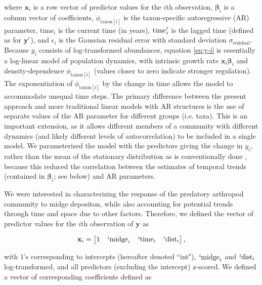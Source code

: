 \noindent where $\mathbf{x}_i$ is a row vector of predictor values for the $i$th
observation,
${\boldsymbol\beta}_i$ is a column vector of coefficients,
$\phi_{\text{taxon}[i]}$ is the taxon-specific autoregressive (AR) parameter,
$\text{time}_i$ is the current time (in years),
$\text{time}\sp{\prime}_i$ is the lagged time (defined as for  $\mathbf{y\sp{\prime}}$),
and $\epsilon_i$  is the Gaussian residual
error with standard deviation $\sigma_{\text{residual}}$.
Because $y_i$ consists of log-transformed abundances, equation \ref{eq:y-i} is
essentially a log-linear model of population dynamics, with intrinsic growth rate
$\mathbf{x}_i{\boldsymbol\beta}_i$ and density-dependence $\phi_{\text{taxon}[i]}$
(values closer to zero indicate stronger regulation).
The exponentiation of $\phi_{\text{taxon}[i]}$ by the change in time allows the model
to accommodate unequal time steps.
The primary difference between the present approach and more traditional linear models
with AR structures \citep[e.g ][]{Zuur2009} is the use of separate values of the AR
parameter for different groups (i.e. taxa).
This is an important extension, as it allows different members of a community with
different dynamics (and likely different levels of autocorrelation) to be included
in a single model.
We parameterized the model with the predictors giving the change in $y_i$,
rather than the mean of the stationary distribution as is conventionally done
\citep{Harvey1990, Ives2006},
because this reduced the correlation between the estimates of temporal trends
(contained in ${\boldsymbol\beta}_i$; see below) and AR parameters.

We were interested in characterizing the response of the predatory arthropod
community to midge depositon, while also accounting for potential trends through
time and space due to other factors.
Therefore, we defined the vector of predictor values for the $i$th observation
of $\mathbf{y}$ as

\begin{equation} \label{eq:x-vec}
    \mathbf{x}_i = \begin{bmatrix}
        1 & {}^z\hspace*{-1pt}\text{midge}_i &
        {}^z\hspace*{-1pt}\text{time}_i & {}^z\hspace*{-1pt}\text{dist}_i
    \end{bmatrix}\text{,}
\end{equation}

\noindent with $1$'s corresponding to intercepts (hereafter denoted ``int"),
${}^z\hspace*{-1pt}\text{midge}_i$ and ${}^z\hspace*{-1pt}\text{dist}_i$ log-transformed,
and all predictors (excluding the intercept) z-scored.
We defined a vector of corresponding coefficients defined as

